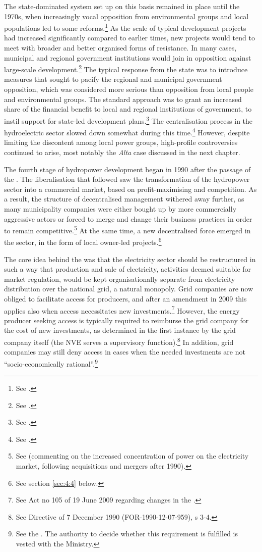 The state-dominated system set up on this basis remained in place until the 1970s, when increasingly vocal opposition from environmental groups and local populations led to some reforms.\footnote{See \cite[71-75]{thue96}.} As the scale of typical development projects had increased significantly compared to earlier times, new projects would tend to meet with broader and better organised forms of resistance. In many cases, municipal and regional government institutions would join in opposition against large-scale development.\footnote{See \cite[71-72]{thue96}.} The typical response from the state was to introduce measures that sought to pacify the regional and municipal government opposition, which was considered more serious than opposition from local people and environmental groups. The standard approach was to grant an increased share of the financial benefit to local and regional institutions of government, to instil support for state-led development plans.\footnote{See \cite[73-76]{nilsen08}.} The centralisation process in the hydroelectric sector slowed down somewhat during this time.\footnote{See \cite[85]{thue96}.} However, despite limiting the discontent among local power groups, high-profile controversies continued to arise, most notably the {\it Alta} case discussed in the next chapter.

The fourth stage of hydropower development began in 1990 after the passage of the \cite{ea90}. The liberalisation that followed saw the transformation of the hydropower sector into a commercial market, based on profit-maximising and competition. As a result, the structure of decentralised management withered away further, as many municipality companies were either bought up by more commercially aggressive actors or forced to merge and change their business practices in order to remain competitive.\footnote{See \cite[583]{bibow03} (commenting on the increased concentration of power on the electricity market, following acquisitions and mergers after 1990).} At the same time, a new decentralised force emerged in the sector, in the form of local owner-led projects.\footnote{See section \ref{sec:4:4} below.}

The core idea behind the \cite{ea90} was that the electricity sector should be restructured in such a way that production and sale of electricity, activities deemed suitable for market regulation, would be kept organisationally separate from electricity distribution over the national grid, a natural monopoly. Grid companies are now obliged to facilitate access for producers, and after an amendment in 2009 this applies also when access necessitates new investments.\footnote{See Act no 105 of 19 June 2009 regarding changes in the \cite{ea90}.} However, the energy producer seeking access is typically required to reimburse the grid company for the cost of new investments, as determined in the first instance by the grid company itself (the NVE serves a supervisory function).\footnote{See Directive of 7 December 1990 (FOR-1990-12-07-959), s 3-4.} In addition, grid companies may still deny access in cases when the needed investments are not ``socio-economically rational''.\footnote{See the \dni\cite[3-4]{ea90}. The authority to decide whether this requirement is fulfilled is vested with the Ministry.}

